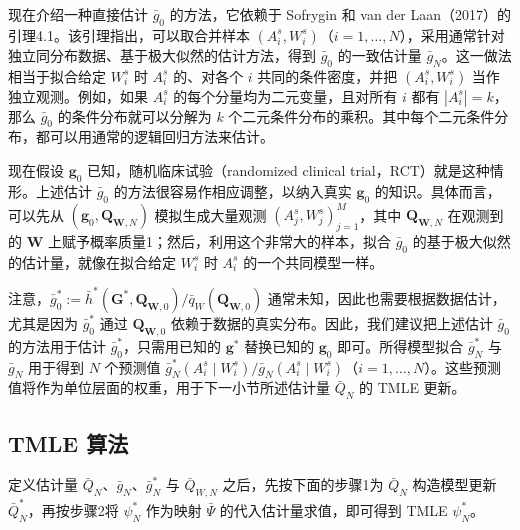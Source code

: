 现在介绍一种直接估计 $\bar g_0$ 的方法，它依赖于 Sofrygin 和 van der Laan（2017）的引理4.1。该引理指出，可以取合并样本 $(A_i^s,W_i^s)$（$i=1,\ldots,N$），采用通常针对独立同分布数据、基于极大似然的估计方法，得到 $\bar g_0$ 的一致估计量 $\bar g_N$。这一做法相当于拟合给定 $W_i^s$ 时 $A_i^s$ 的、对各个 $i$ 共同的条件密度，并把 $(A_i^s,W_i^s)$ 当作独立观测。例如，如果 $A_i^s$ 的每个分量均为二元变量，且对所有 $i$ 都有 $|A_i^s|=k$，那么 $\bar g_0$ 的条件分布就可以分解为 $k$ 个二元条件分布的乘积。其中每个二元条件分布，都可以用通常的逻辑回归方法来估计。

现在假设 $\bm g_0$ 已知，随机临床试验（randomized clinical trial，RCT）就是这种情形。上述估计 $\bar g_0$ 的方法很容易作相应调整，以纳入真实 $\bm g_0$ 的知识。具体而言，可以先从 $(\bm g_0,\bm Q_{\bm W,N})$ 模拟生成大量观测 $(A_j^s,W_j^s)_{j=1}^M$，其中 $\bm Q_{\bm W,N}$ 在观测到的 $\bm W$ 上赋予概率质量1；然后，利用这个非常大的样本，拟合 $\bar g_0$ 的基于极大似然的估计量，就像在拟合给定 $W_i^s$ 时 $A_i^s$ 的一个共同模型一样。

注意，$\bar g_0^*:=\bar h^*(\bm G^*,\bm Q_{\bm W,0})/\bar q_W(\bm Q_{\bm W,0})$ 通常未知，因此也需要根据数据估计，尤其是因为 $\bar g_0^*$ 通过 $\bm Q_{\bm W,0}$ 依赖于数据的真实分布。因此，我们建议把上述估计 $\bar g_0$ 的方法用于估计 $\bar g_0^*$，只需用已知的 $\bm g^*$ 替换已知的 $\bm g_0$ 即可。所得模型拟合 $\bar g_N^*$ 与 $\bar g_N$ 用于得到 $N$ 个预测值 $\bar g_N^*(A_i^s\mid W_i^s)/\bar g_N(A_i^s\mid W_i^s)$（$i=1,\ldots,N$）。这些预测值将作为单位层面的权重，用于下一小节所述估计量 $\bar Q_N$ 的 TMLE 更新。

\subsection{TMLE 算法}

定义估计量 $\bar Q_N$、$\bar g_N$、$\bar g_N^*$ 与 $\bar Q_{W,N}$ 之后，先按下面的步骤1为 $\bar Q_N$ 构造模型更新 $\bar Q_N^*$，再按步骤2将 $\psi_N^*$ 作为映射 $\bar\Psi$ 的代入估计量求值，即可得到 TMLE $\psi_N^*$。

